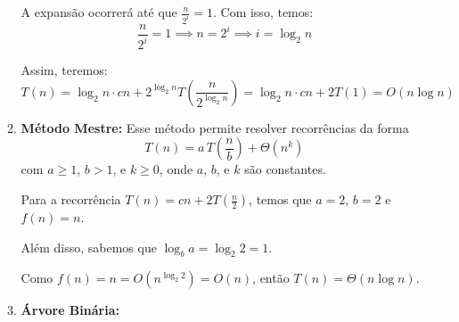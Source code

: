 \begin{enumerate}
\begin{enumerate}
            A expansão ocorrerá até que \( \frac{n}{2^i} = 1 \).
            Com isso, temos:
            \[
            \frac{n}{2^i} = 1 \implies n = 2^i \implies i = \log_2 n
            \]
            
            Assim, teremos:
            \[
            T(n) = \log_2 n \cdot cn + 2^{\log_2 n} T\left(\frac{n}{2^{\log_2 n}}\right)
            = \log_2 n \cdot cn + 2T(1)
            = O(n \log n)
            \]

            
            \item \textbf{Método Mestre:}
              Esse método permite resolver recorrências da forma 
              \[
              T(n) = a \, T\left(\frac{n}{b}\right) + \Theta(n^k)
              \]
              com \( a \geq 1 \), \( b > 1 \), e \( k \geq 0 \), onde \( a \), \( b \), e \( k \) são constantes.
        
              Para a recorrência \( T(n) = cn + 2T\left(\frac{n}{2}\right) \), temos que \( a = 2 \), \( b = 2 \) e \( f(n) = n \).
        
              Além disso, sabemos que \( \log_b a = \log_2 2 = 1 \).
        
              Como \( f(n) = n = O(n^{\log_2 2}) = O(n) \), então \( T(n) = \Theta(n \log n) \).

            
            
            \item \textbf{Árvore Binária:}
            
        
        \end{enumerate}    

\end{enumerate}